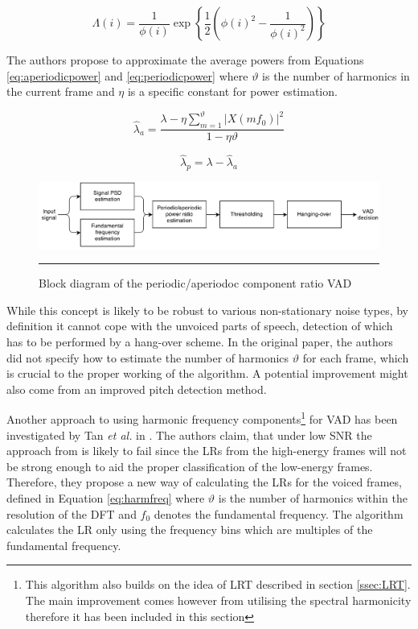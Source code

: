 \begin{equation}
\Lambda(i) = \frac{1}{\phi (i)} \exp \left\{ \frac{1}{2} \left( \phi (i)^{2} - \frac{1}{\phi (i)^{2}} \right) \right\}
\label{eq:PARADE}
\end{equation}

The authors propose to approximate the average powers from Equations \ref{eq:aperiodicpower} and \ref{eq:periodicpower} where $\vartheta$ is the number of harmonics in the current frame and $\eta$ is a specific constant for power estimation.

\begin{equation}
\hat{\lambda}_a = \frac{\lambda - \eta \sum_{m=1}^{\vartheta} \left| X(m f_0) \right|^{2}}{1-\eta \vartheta}
\label{eq:aperiodicpower}
\end{equation}

\begin{equation}
\hat{\lambda}_p = \lambda - \hat{\lambda}_a
\label{eq:periodicpower}
\end{equation}

\begin{figure}[htbp]
	\centering
		\includegraphics[width=0.9\columnwidth]{Figures/Chapter2/PARADE.png}
		\rule{37em}{0.5pt}
	\caption[Block diagram of the periodic/aperiodoc component ratio VAD]{Block diagram of the periodic/aperiodoc component ratio VAD \cite{PARADE}}
	\label{fig:PARADE}
\end{figure}

While this concept is likely to be robust to various non-stationary noise types, by definition it cannot cope with the unvoiced parts of speech, detection of which has to be performed by a hang-over scheme. In the original paper, the authors did not specify how to estimate the number of harmonics $\vartheta$ for each frame, which is crucial to the proper working of the algorithm. A potential improvement might also come from an improved pitch detection method.

Another approach to using harmonic frequency components\footnote{This algorithm also builds on the idea of LRT described in section \ref{ssec:LRT}. The main improvement comes however from utilising the spectral harmonicity therefore it has been included in this section} for VAD has been investigated by Tan \emph{et al.} in \cite{Tan}. The authors claim, that under low SNR the approach from \cite{RamirezMulti} is likely to fail since the LRs from the high-energy frames will not be strong enough to aid the proper classification of the low-energy frames. Therefore, they propose a new way of calculating the LRs for the voiced frames, defined in Equation \ref{eq:harmfreq} where $\vartheta$ is the number of harmonics within the resolution of the DFT and $f_0$ denotes the fundamental frequency. The algorithm calculates the LR only using the frequency bins which are multiples of the fundamental frequency.

